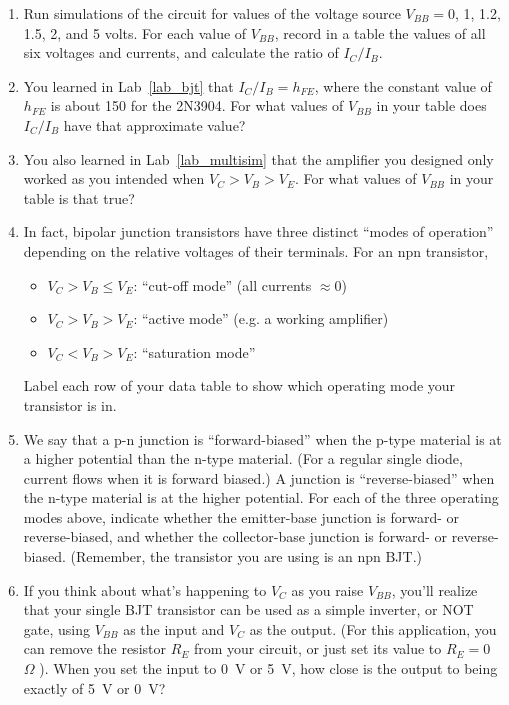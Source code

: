 \begin{enumerate}[wide]
\item Run simulations of the circuit for values of the voltage source $V_{BB} = 0$, 1, 1.2, 1.5, 2, and 5 volts.  For each value of $V_{BB}$, record in a table the values of all six voltages and currents, and calculate the ratio of  $I_C/I_B$.

\item You learned in Lab~\ref{lab_bjt} that $I_C / I_B = h_{FE}$, where the constant value of $h_{FE}$ is about 150 for the 2N3904.  For what values of $V_{BB}$ in your table does $I_C/I_B$ have that approximate value?

\item You also learned in  Lab~\ref{lab_multisim} that the amplifier you designed only worked as you intended when $V_C > V_B > V_E$.  For what values of $V_{BB}$ in your table is that true?

\item In fact, bipolar junction transistors have three distinct ``modes of operation'' depending on the relative voltages of their terminals.  For an npn transistor,
\begin{itemize}[nosep]
\item $V_C > V_B \leq V_E$: ``cut-off mode'' (all currents $\approx 0$)
\item $V_C > V_B > V_E$: ``active mode''  (e.g. a working amplifier)
\item$V_C < V_B > V_E$: ``saturation mode''
\end{itemize}
Label each row of your data table to show which operating mode your transistor is in.

\item We say that a p-n junction is ``forward-biased'' when the p-type material is at a higher potential than the n-type material.  (For a regular single diode, current flows when it is forward biased.)  A junction is ``reverse-biased'' when the n-type material is at the higher potential.  For each of the three operating modes above, indicate whether the emitter-base junction is forward- or reverse-biased, and whether the collector-base junction is forward- or reverse-biased.  (Remember, the transistor you are using is an npn BJT.)

\item If you think about what's happening to $V_C$ as you raise $V_{BB}$, you'll realize that your single BJT transistor can be used as a simple inverter, or NOT gate, using $V_{BB}$ as the input and $V_C$ as the output.  (For this application, you can remove the resistor $R_E$ from your circuit, or just set its value to $R_E = 0$~$\Omega$ ).  When you set the input to 0~V or 5~V, how close is the output to being exactly of 5~V or 0~V?  


\end{enumerate}
